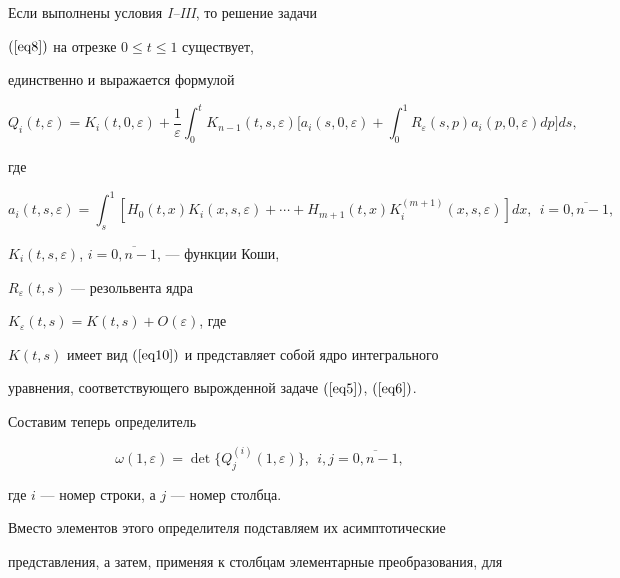 \begin{lem}


Если выполнены условия {\em I--III}, то решение задачи 


$(\ref{eq8})$ на отрезке $0 \le t \le 1$ существует,


единственно и выражается формулой


$$


Q_{i}(t,\varepsilon)=K_{i}(t,0,\varepsilon)+\frac{1}{\varepsilon}


\int_{0}^{t}K_{n-1}(t,s,\varepsilon)\bigg[a_{i}(s,0,\varepsilon)+


\int_{0}^{1}R_{\varepsilon}(s,p)a_{i}(p,0,\varepsilon)dp\bigg]ds, 


$$


где


$$


a_{i} (t,s,\varepsilon)=\int_{s}^{1}[H_{0}(t,x)K_{i} 


(x,s,\varepsilon)+\dotsb+H_{m+1}(t,x)K_{i}^{(m+1)}(x,s,\varepsilon)]dx,


\ \ i = \overline {0,n-1},


$$


$K_{i}(t,s,\varepsilon)$, $i=\overline{0,n-1}$, --- функции Коши,


$R_{\varepsilon}(t,s)$ --- резольвента ядра


$K_{\varepsilon}(t,s)=K(t,s)+O(\varepsilon)$, где


$K(t,s)$ имеет вид $(\ref{eq10})$ и представляет собой ядро интегрального 


уравнения, соответствующего вырожденной задаче $(\ref{eq5})$, $(\ref{eq6})$.


\end{lem}





Составим теперь определитель


\begin{equation}


\label{eq11}


\omega (1,\varepsilon)=\det\{Q_{j}^{(i)}(1,\varepsilon)\}, \ \


i,j=\overline{0,n-1},


\end{equation}


где $i$ --- номер строки, а $j$ --- номер столбца.


Вместо элементов этого определителя подставляем их асимптотические 


представления, а затем, применяя к столбцам элементарные преобразования, для 


